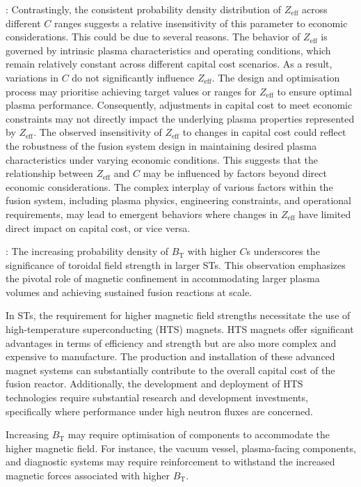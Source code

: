 \documentclass[journal]{IEEEtran}
\begin{document}
: Contrastingly, the consistent probability density distribution of $Z_{\text{eff}}$ across different $C$ ranges suggests a relative insensitivity of this parameter to economic considerations. This could be due to several reasons. The behavior of $Z_{\text{eff}}$ is governed by intrinsic plasma characteristics and operating conditions, which remain relatively constant across different capital cost scenarios. As a result, variations in $C$ do not significantly influence $Z_{\text{eff}}$. The design and optimisation process may prioritise achieving target values or ranges for $Z_{\text{eff}}$ to ensure optimal plasma performance. Consequently, adjustments in capital cost to meet economic constraints may not directly impact the underlying plasma properties represented by $Z_{\text{eff}}$. The observed insensitivity of $Z_{\text{eff}}$ to changes in capital cost could reflect the robustness of the fusion system design in maintaining desired plasma characteristics under varying economic conditions. This suggests that the relationship between $Z_{\text{eff}}$ and $C$ may be influenced by factors beyond direct economic considerations. The complex interplay of various factors within the fusion system, including plasma physics, engineering constraints, and operational requirements, may lead to emergent behaviors where changes in $Z_{\text{eff}}$ have limited direct impact on capital cost, or vice versa.

: The increasing probability density of $B_{\text{T}}$ with higher $C$s underscores the significance of toroidal field strength in larger STs. This observation emphasizes the pivotal role of magnetic confinement in accommodating larger plasma volumes and achieving sustained fusion reactions at scale. 

In STs, the requirement for higher magnetic field strengths necessitate the use of high-temperature superconducting (HTS) magnets. HTS magnets offer significant advantages in terms of efficiency and strength but are also more complex and expensive to manufacture. The production and installation of these advanced magnet systems can substantially contribute to the overall capital cost of the fusion reactor. Additionally, the development and deployment of HTS technologies require substantial research and development investments, specifically where performance under high neutron fluxes are concerned. 

Increasing $B_{\text{T}}$ may require optimisation of components to accommodate the higher magnetic field. For instance, the vacuum vessel, plasma-facing components, and diagnostic systems may require reinforcement to withstand the increased magnetic forces associated with higher $B_{\text{T}}$. 
\end{document}
